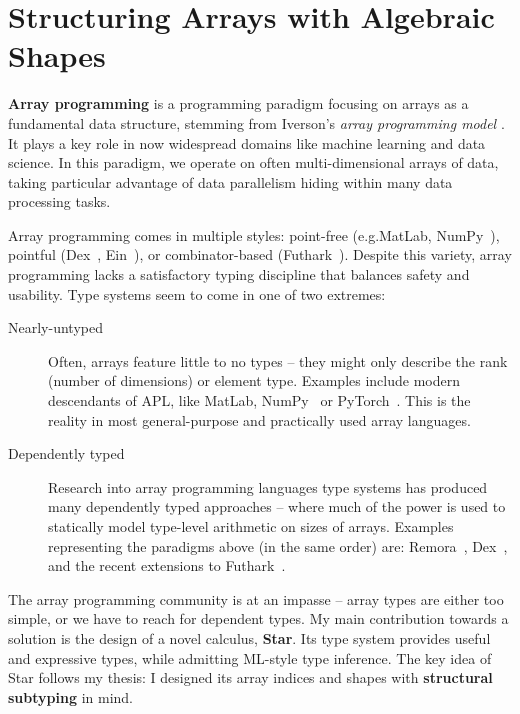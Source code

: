 \chapter{Structuring Arrays with Algebraic Shapes}
\label{star}

\textbf{Array programming} is a programming paradigm focusing on arrays as a fundamental data structure, stemming from Iverson's \emph{array programming model} \cite{apl}. It plays a key role in now widespread domains like machine learning and data science. In this paradigm, we operate on often multi-dimensional arrays of data, taking particular advantage of data parallelism hiding within many data processing tasks. 

Array programming comes in multiple styles: point-free (e.g.\@ MatLab, NumPy~\cite{numpy}), pointful (Dex~\cite{dex}, Ein~\cite{ein}), or combinator-based (Futhark~\cite{futhark}). Despite this variety, array programming lacks a satisfactory typing discipline that balances safety and usability. Type systems seem to come in one of two extremes: \begin{description}
    \item[Nearly-untyped] Often, arrays feature little to no types -- they might only describe the rank (number of dimensions) or element type. Examples include modern descendants of APL, like MatLab, NumPy~\cite{numpy} or PyTorch~\cite{pytorch}. This is the reality in most general-purpose and practically used array languages.
    \item[Dependently typed] Research into array programming languages type systems has produced many dependently typed approaches -- where much of the power is used to statically model type-level arithmetic on sizes of arrays. Examples representing the paradigms above (in the same order) are: Remora~\cite{remora}, Dex~\cite{dex}, and the recent extensions to Futhark~\cite{futhark-size-dependent, futhark-size-dependent-towards}.
\end{description}

The array programming community is at an impasse -- array types are either too simple, or we have to reach for dependent types. My main contribution towards a solution is the design of a novel calculus, \textbf{Star}. Its type system provides useful and expressive types, while admitting ML-style type inference.
The key idea of Star follows my thesis: I designed its array indices and shapes with \textbf{structural subtyping} in mind.

